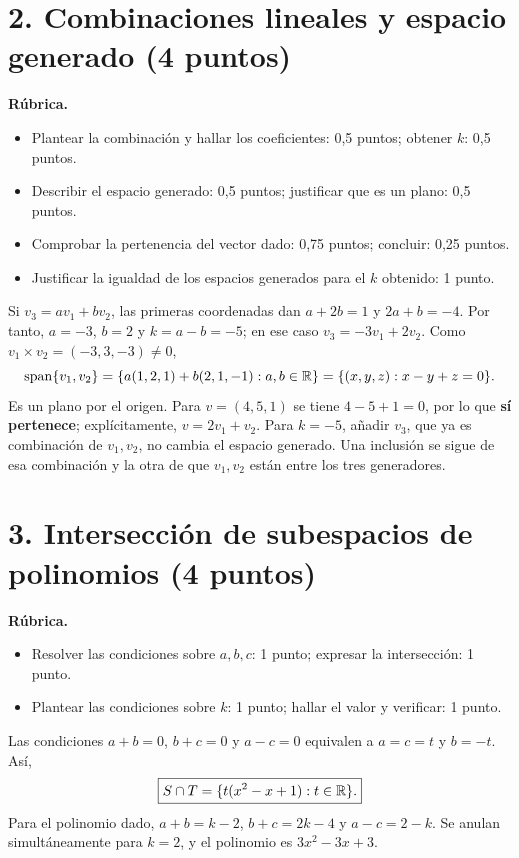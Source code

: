 \documentclass[10pt,a4]{examenEPN0}
\begin{document}
\section*{2. Combinaciones lineales y espacio generado (4 puntos)}
\noindent\textbf{Rúbrica.}
\begin{itemize}[itemsep=2pt]
    \item Plantear la combinación y hallar los coeficientes: 0,5 puntos; obtener $k$: 0,5 puntos.
    \item Describir el espacio generado: 0,5 puntos; justificar que es un plano: 0,5 puntos.
    \item Comprobar la pertenencia del vector dado: 0,75 puntos; concluir: 0,25 puntos.
    \item Justificar la igualdad de los espacios generados para el $k$ obtenido: 1 punto.
\end{itemize}
Si $v_3=a v_1+b v_2$, las primeras coordenadas dan
$a+2b=1$ y $2a+b=-4$. Por tanto, $a=-3$, $b=2$ y
$k=a-b=-5$; en ese caso $v_3=-3v_1+2v_2$.
Como $v_1\times v_2=(-3,3,-3)\ne0$,
\[
    \operatorname{span}\{v_1,v_2\}
    =\{a(1,2,1)+b(2,1,-1):a,b\in\mathbb{R}\}
    =\{(x,y,z):x-y+z=0\}.
\]
Es un plano por el origen. Para $v=(4,5,1)$ se tiene
$4-5+1=0$, por lo que \textbf{sí pertenece}; explícitamente,
$v=2v_1+v_2$.
Para $k=-5$, añadir $v_3$, que ya es combinación de $v_1,v_2$,
no cambia el espacio generado. Una inclusión se sigue de esa combinación
y la otra de que $v_1,v_2$ están entre los tres generadores.

\section*{3. Intersección de subespacios de polinomios (4 puntos)}
\noindent\textbf{Rúbrica.}
\begin{itemize}[itemsep=2pt]
    \item Resolver las condiciones sobre $a,b,c$: 1 punto; expresar la intersección: 1 punto.
    \item Plantear las condiciones sobre $k$: 1 punto; hallar el valor y verificar: 1 punto.
\end{itemize}
Las condiciones $a+b=0$, $b+c=0$ y $a-c=0$ equivalen a
$a=c=t$ y $b=-t$. Así,
\[
    \boxed{S\cap T=\{t(x^2-x+1):t\in\mathbb{R}\}.}
\]
Para el polinomio dado, $a+b=k-2$, $b+c=2k-4$ y
$a-c=2-k$. Se anulan simultáneamente para $k=2$, y el
polinomio es $3x^2-3x+3$.
\end{document}
